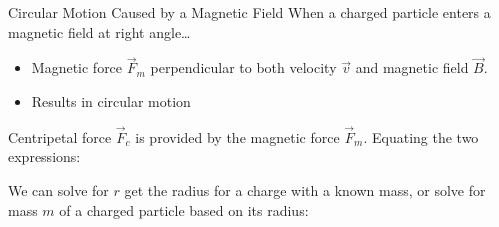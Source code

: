 \documentclass[12pt,aspectratio=169]{beamer}
\begin{document}
\begin{frame}{Circular Motion Caused by a Magnetic Field}
  When a charged particle enters a magnetic field at right angle\ldots
  \begin{itemize}
  \item Magnetic force $\vec F_m$ perpendicular to both velocity $\vec v$ and
    magnetic field $\vec B$.
  \item Results in circular motion
  \end{itemize}
  Centripetal force $\vec F_c$ is provided by the magnetic force $\vec F_m$.
  Equating the two expressions:

  
  We can solve for $r$ get the radius for a charge with a known
  mass, or solve for mass $m$ of a charged particle based on its radius:  

\end{frame}
\end{document}
